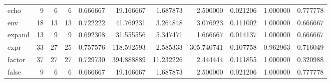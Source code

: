 \begin{longtable}{lrrrrrrrrrr}
echo      &                                       9 &                  6 &                                 6 &                                   0.666667 &                              19.166667 &                                     1.687873 &                          2.500000 &                                0.021206 &                           1.000000 &                                           0.777778 \\
env       &                                      18 &                 13 &                                13 &                                   0.722222 &                              41.769231 &                                     3.264848 &                          3.076923 &                                0.111002 &                           1.000000 &                                           0.666667 \\
expand    &                                      13 &                  9 &                                 9 &                                   0.692308 &                              31.555556 &                                     5.347471 &                          1.666667 &                                0.014137 &                           1.000000 &                                           0.666667 \\
expr      &                                      33 &                 27 &                                25 &                                   0.757576 &                             118.592593 &                                     2.585333 &                        305.740741 &                                0.107758 &                           0.962963 &                                           0.716049 \\
factor    &                                      37 &                 27 &                                27 &                                   0.729730 &                             394.888889 &                                    11.232226 &                          2.444444 &                                0.111855 &                           1.000000 &                                           0.320988 \\
false     &                                       9 &                  6 &                                 6 &                                   0.666667 &                              19.166667 &                                     1.687873 &                          2.500000 &                                0.021206 &                           1.000000 &                                           0.777778 \\

\end{longtable}
